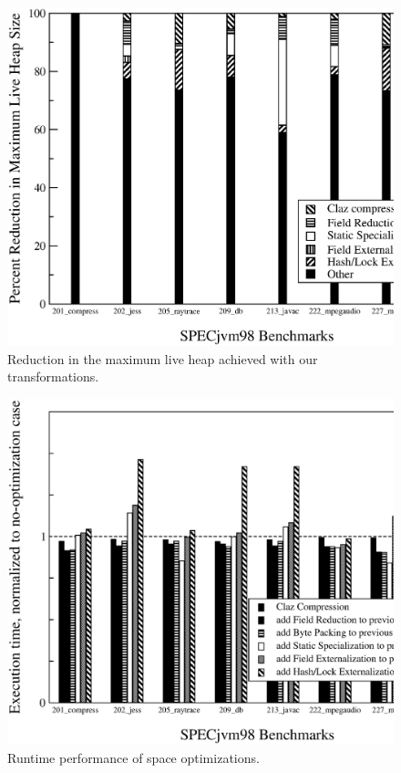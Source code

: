 \documentclass{acmconf}
\begin{document}
\begin{figure}
\includegraphics[scale=0.32,clip=true]{Figures/oopsla-ttllive.eps}
\caption{Reduction in the maximum live heap achieved with our transformations.}
\end{figure}

\begin{figure}
\includegraphics[scale=0.32,clip=true]{Figures/oopsla-speed.eps}
\caption{Runtime performance of space optimizations.}
\label{fig:space}
\end{figure}
\end{document}

